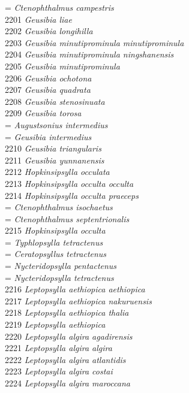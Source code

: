 \documentclass[
]{article}
\begin{document}
= \emph{Ctenophthalmus campestris}\\
2201 \emph{Geusibia liae}\\
2202 \emph{Geusibia longihilla}\\
2203 \emph{Geusibia minutiprominula minutiprominula}\\
2204 \emph{Geusibia minutiprominula ningshanensis}\\
2205 \emph{Geusibia minutiprominula}\\
2206 \emph{Geusibia ochotona}\\
2207 \emph{Geusibia quadrata}\\
2208 \emph{Geusibia stenosinuata}\\
2209 \emph{Geusibia torosa}\\
= \emph{Augustsonius intermedius}\\
= \emph{Geusibia intermedius}\\
2210 \emph{Geusibia triangularis}\\
2211 \emph{Geusibia yunnanensis}\\
2212 \emph{Hopkinsipsylla occulata}\\
2213 \emph{Hopkinsipsylla occulta occulta}\\
2214 \emph{Hopkinsipsylla occulta praeceps}\\
= \emph{Ctenophthalmus isochaetus}\\
= \emph{Ctenophthalmus septentrionalis}\\
2215 \emph{Hopkinsipsylla occulta}\\
= \emph{Typhlopsylla tetractenus}\\
= \emph{Ceratopsyllus tetractenus}\\
= \emph{Nycteridopsylla pentactenus}\\
= \emph{Nycteridopsylla tetractenus}\\
2216 \emph{Leptopsylla aethiopica aethiopica}\\
2217 \emph{Leptopsylla aethiopica nakuruensis}\\
2218 \emph{Leptopsylla aethiopica thalia}\\
2219 \emph{Leptopsylla aethiopica}\\
2220 \emph{Leptopsylla algira agadirensis}\\
2221 \emph{Leptopsylla algira algira}\\
2222 \emph{Leptopsylla algira atlantidis}\\
2223 \emph{Leptopsylla algira costai}\\
2224 \emph{Leptopsylla algira maroccana}\\
\end{document}
